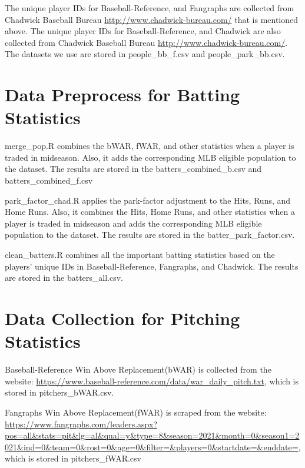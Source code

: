 \documentclass{article}
\begin{document}
\bigskip

The unique player IDs for Baseball-Reference, and Fangraphs are collected from Chadwick Baseball Bureau \url{http://www.chadwick-bureau.com/} that is mentioned above. The unique player IDs for Baseball-Reference, and Chadwick are also collected from Chadwick Baseball Bureau \url{http://www.chadwick-bureau.com/}. The datasets we use are stored in people\_bb\_f.csv and people\_park\_bb.csv. 

 \section{Data Preprocess for Batting Statistics}

merge\_pop.R combines the bWAR, fWAR, and other statistics when a player is traded in midseason. Also, it adds the corresponding MLB eligible population to the dataset. The results are stored in the batters\_combined\_b.csv and batters\_combined\_f.csv

\bigskip

park\_factor\_chad.R applies the park-factor adjustment to the Hits, Runs, and Home Runs. Also, it combines the Hits, Home Runs, and other statistics when a player is traded in midseason and adds the corresponding MLB eligible population to the dataset. The results are stored in the batter\_park\_factor.csv. 

\bigskip

clean\_batters.R combines all the important batting statistics based on the players' unique IDs in Baseball-Reference, Fangraphs, and Chadwick. The results are stored in the batters\_all.csv. 

\section{Data Collection for Pitching Statistics}

Baseball-Reference Win Above Replacement(bWAR) is collected from the website: \url{https://www.baseball-reference.com/data/war_daily_pitch.txt}, which is stored in pitchers\_bWAR.csv. 

\bigskip

Fangraphs Win Above Replacement(fWAR) is scraped from the website: \url {https://www.fangraphs.com/leaders.aspx?pos=all&stats=pit&lg=al&qual=y&type=8&season=2021&month=0&season1=2021&ind=0&team=0&rost=0&age=0&filter=&players=0&startdate=&enddate=}, which is stored in pitchers\_fWAR.csv

\bigskip
\end{document}
